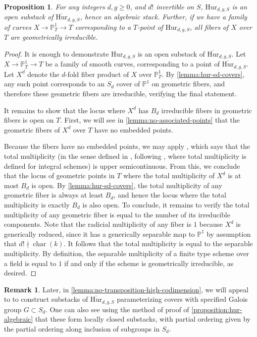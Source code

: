 \documentclass[12 pt]{amsart}
\newcommand{\rboxed}[1]{#1}
\theoremstyle{plain}
\newtheorem{proposition}[theorem]{Proposition}
\theoremstyle{definition}
\newtheorem{remark}[theorem]{Remark}
\theoremstyle{remark}
\numberwithin{equation}{section}
\newcommand\bp{\mathbb P}
\newcommand\bighurg[3]{\overline{\mathrm{Hur}}_{#1,#2, #3}} %
\newcommand\hur[3]{\mathrm{Hur}_{#1,#2,#3}} %
\DeclareMathOperator\chr{\operatorname{char}}
\begin{document}
\begin{proposition} \label{proposition:hur-algebraic} 
	For any integers $d, g \geq 0$, and $d!$ invertible on $S$, $\hur d g S$
	is an open substack of $\bighurg d g S$, hence an algebraic stack.  Further, if we have a family of curves $X \to
	\bp^1_T \to T$ corresponding to a $T$-point of $\hur d g S$, all fibers
	of $X$ over $T$ are geometrically irreducible.  \end{proposition}
	\begin{proof} 
		It is enough to demonstrate $\hur d g S$ is an open substack of $\bighurg d
		g S$.
Let $X \to \bp^1_T \to T$ be a family of smooth curves, corresponding to a point
of $\bighurg d g S$.  Let $\rboxed{X^d}$ denote the 
$d$-fold fiber product of $X$ over $\bp^1_T$.  
By \autoref{lemma:hur-sd-covers}, 
any such point corresponds to an $S_d$ cover of $\bp^1$ on geometric fibers, and
therefore these geometric fibers are irreducible, verifying the final statement.

	It remains to show that the locus where $X^d$ has $B_d$
	irreducible fibers in geometric fibers is open on $T$.  First, we will see in
	\autoref{lemma:no-associated-points} that the geometric fibers of $X^d$
	over $T$ have no embedded points.
	
	Because the fibers have no embedded points, we may apply
	\cite[12.2.1(xi)]{EGAIV.3}, which says that the total multiplicity (in
	the sense defined in \cite[p. 77]{EGAIV.2}, following
\cite[4.7.4]{EGAIV.2}, where total multiplicity is defined for integral schemes)
is upper semicontinuous.  From this, we conclude that the locus of geometric points in $T$ where the total
multiplicity of $X^d$ is at most $B_d$ is open.
By \autoref{lemma:hur-sd-covers},
the total multiplicity of any geometric fiber is always at least $B_d$, and hence
the locus where the total multiplicity is exactly $B_d$ is also open.
To conclude, it remains to verify the total multiplicity of any
geometric fiber is equal to the number of its irreducible components.
Note that the radicial multiplicity
of any fiber is
$1$ because $X^d$ is generically reduced, since it has a generically separable
map to $\bp^1$ by assumption that $d! \nmid \chr(k)$.  It follows that the total
multiplicity is equal to the separable multiplicity.  By definition, the
separable multiplicity of a finite type scheme over a field is equal to $1$ if
and only if the scheme is geometrically irreducible, as desired.
\end{proof} 

\begin{remark}
	\label{remark:direct-group-hur}
	Later, in \autoref{lemma:no-transposition-high-codimension},
	we will appeal to \cite{wewers:thesis}
	to construct substacks of $\bighurg d g S$ parameterizing covers with
	specified Galois group $G \subset S_d$.
	One can also see using the method of proof of
	\autoref{proposition:hur-algebraic} that these form locally closed
	substacks, with partial ordering given by the partial ordering along
	inclusion of subgroups in $S_d$.
\end{remark}
\end{document}
